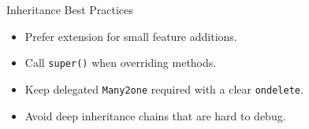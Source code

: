 \begin{frame}[fragile]{Inheritance Best Practices}
	\begin{itemize}
		\item Prefer extension for small feature additions.
		\item Call \texttt{super()} when overriding methods.
		\item Keep delegated \texttt{Many2one} required with a clear \texttt{ondelete}.
		\item Avoid deep inheritance chains that are hard to debug.
	\end{itemize}
\end{frame}
